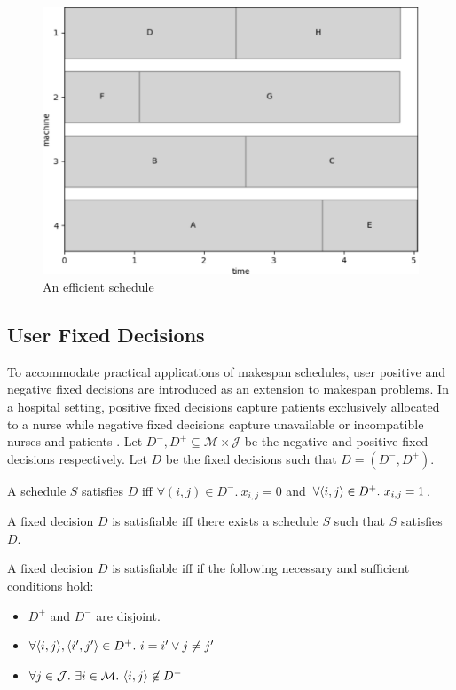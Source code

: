 \begin{figure}[H]
	\begin{center}
		\includegraphics[width=.8\linewidth]{figures/makespan_efficient.pdf}	
	\end{center}
	\caption{An efficient schedule}
\end{figure}

\subsection{User Fixed Decisions}

To accommodate practical applications of makespan schedules, user positive and negative fixed decisions are introduced as an extension to makespan problems. In a hospital setting, positive fixed decisions capture patients exclusively allocated to a nurse while negative fixed decisions capture unavailable or incompatible nurses and patients \cite{aes}. Let $D^-,D^+\subseteq\mathcal{M}\times\mathcal{J}$ be the negative and positive fixed decisions respectively. Let $D$ be the fixed decisions such that $D=(D^-,D^+)$.

\begin{definition}
	A schedule $S$ satisfies $D$ iff $\forall(i,j)\in D^-.\ x_{i,j}=0$ and $\forall \pair{i}{j}\in D^+.\ x_{i,j}=1$.
\end{definition}

\begin{definition}
	A fixed decision $D$ is satisfiable iff there exists a schedule $S$ such that $S$ satisfies $D$. 
\end{definition}

A fixed decision $D$ is satisfiable iff if the following necessary and sufficient conditions hold:
\begin{itemize}
	\item$D^+$ and $D^-$ are disjoint.
	\item$\forall\langle{i},{j}\rangle,\langle{i'},{j'}\rangle\in D^+.\ i=i'\lor j\neq j'$
	\item$\forall j\in\mathcal{J}.\ \exists i\in\mathcal{M}.\ \langle{i},{j}\rangle\not\in D^-$
\end{itemize}

